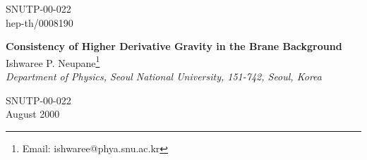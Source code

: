\documentclass[a4paper,12pt]{article}
\begin{document}
\topmargin -0.8cm
\oddsidemargin -0.8cm
\evensidemargin -0.8cm
\pagestyle{empty}
\begin{flushright}
SNUTP-00-022\\
hep-th/0008190
\end{flushright}
\begin{center}
{\large\bf Consistency of Higher Derivative Gravity in the Brane Background}\\
\vspace{0.6cm}
{\large Ishwaree P. Neupane\footnote{Email: ishwaree@phya.snu.ac.kr}}\\
\vspace{0.4cm}
{\it{Department of Physics, Seoul National University, 151-742, Seoul, 
Korea}}\\
\end{center}
\vspace{1cm}
\begin{abstract}
We consider the theory of higher derivative gravity with non-factorizable 
Randall-Sundrum type space-time and obtain the metric solutions 
which characterize the \coordHE{}-brane world-volume as a curved or planar defect 
embedded in the higher dimensions. We consider the string inspired effective 
action of the dilatonic Gauss-Bonnet type in the brane background and show 
its consistency with the RS brane-world scenario and the conformal 
weights of dilaton couplings in the string theory with appropriate 
choice of Regge slope (\coordHE{}) or Gauss-Bonnet coupling (\myHighlight{$\alpha$}\coordHE{}) 
or both. We also discuss time dependent dilaton solutions 
for a version of string-inspired fourth-derivative gravity model. 
\end{abstract}
\begin{flushleft}
SNUTP-00-022\\
August 2000
\end{flushleft}
\vfill
\eject
\pagestyle{empty}
\setcounter{page}{1}
\setcounter{footnote}{0}
\pagestyle{plain}
\end{document}
